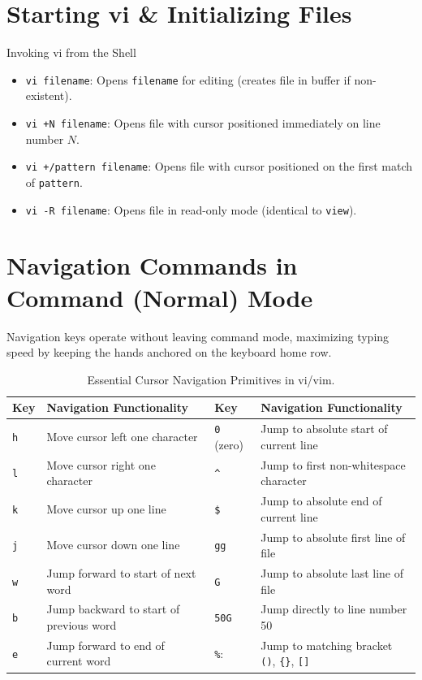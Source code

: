 \section{Starting vi \& Initializing Files}
\begin{commandbox}{Invoking vi from the Shell}
\begin{itemize}[leftmargin=1.5em]
    \item \texttt{vi filename}: Opens \texttt{filename} for editing (creates file in buffer if non-existent).
    \item \texttt{vi +N filename}: Opens file with cursor positioned immediately on line number $N$.
    \item \texttt{vi +/pattern filename}: Opens file with cursor positioned on the first match of \texttt{pattern}.
    \item \texttt{vi -R filename}: Opens file in read-only mode (identical to \texttt{view}).
\end{itemize}
\end{commandbox}

\section{Navigation Commands in Command (Normal) Mode}
Navigation keys operate without leaving command mode, maximizing typing speed by keeping the hands anchored on the keyboard home row.

\begin{table}[htbp]
\centering
\small
\begin{tabularx}{\linewidth}{l X l X}
\toprule
\textbf{Key} & \textbf{Navigation Functionality} & \textbf{Key} & \textbf{Navigation Functionality} \\
\midrule
\texttt{h} & Move cursor left one character & \texttt{0} (zero) & Jump to absolute start of current line \\
\texttt{l} & Move cursor right one character & \texttt{\^{}} & Jump to first non-whitespace character \\
\texttt{k} & Move cursor up one line & \texttt{\$} & Jump to absolute end of current line \\
\texttt{j} & Move cursor down one line & \texttt{gg} & Jump to absolute first line of file \\
\texttt{w} & Jump forward to start of next word & \texttt{G} & Jump to absolute last line of file \\
\texttt{b} & Jump backward to start of previous word & \texttt{50G} & Jump directly to line number 50 \\
\texttt{e} & Jump forward to end of current word & \texttt{\%}: & Jump to matching bracket \texttt{()}, \texttt{\{\}}, \texttt{[]} \\
\bottomrule
\end{tabularx}
\caption{Essential Cursor Navigation Primitives in vi/vim.}
\label{tab:vi-nav}
\end{table}

